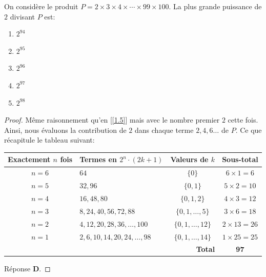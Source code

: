 % 
%
On considère le produit $P = 2 \times 3 \times 4 \times \cdots \times 99 \times 100$. La plus grande puissance de $2$ divisant 
$P$ est:
%
\begin{enumerate}
  \item $2^{94}$
  \item $2^{95}$
  \item $2^{96}$
  \item $2^{97}$
  \item $2^{98}$
\end{enumerate}
%
\begin{proof}
Même raisonnement qu'en [\ref{1.5}] mais avec le nombre premier $2$ cette fois. Ainsi, nous évaluons la contribution de $2$ %
dans chaque terme $2, 4, 6 \dots$ de $P$. Ce que récapitule le tableau suivant:
%
\begin{table}[H]
  \centering
  \renewcommand{\arraystretch}{1.5}
  \begin{tabular}{|c|l|c|c|} %
  \hline
  \textbf{Exactement $n$ fois} & \textbf{Termes en $2^n \cdot (2k+1)$} & \textbf{Valeurs de $k$} & \textbf{Sous-total} \\
  \hline
    $n = 6$ & $64$ & $\{0\}$ & $6 \times 1 = 6$ \\
    $n = 5$ & $32, 96$ & $\{0, 1\}$ & $5 \times 2 = 10$ \\
    $n = 4$ & $16, 48, 80$ & $\{0, 1, 2\}$ & $4 \times 3 = 12$ \\
    $n = 3$ & $8, 24, 40, 56, 72, 88$ & $\{0, 1, \dots, 5\}$ & $3 \times 6 = 18$ \\
    $n = 2$ & $4, 12, 20, 28, 36, \dots, 100$ & $\{0, 1, \dots, 12\}$ & $2 \times 13 = 26$ \\
    $n = 1$ & $2, 6, 10, 14,  20, 24, \dots, 98$ & $\{0, 1, \dots, 14\}$ & $1 \times 25 = 25$ \\
  \hline
  \multicolumn{3}{|r|}{\textbf{Total}} & \textbf{97}  \\
  \hline
  \end{tabular}
\end{table}
%
\noindent Réponse \textbf{D}.
\end{proof}